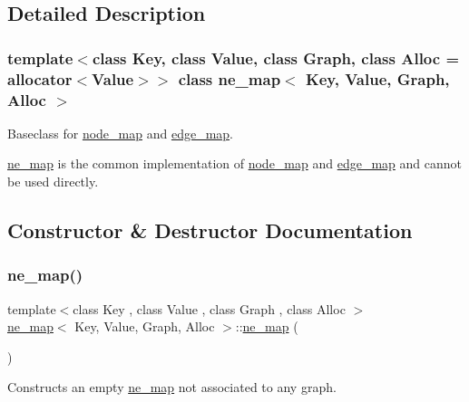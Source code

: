 \subsection{Detailed Description}
\subsubsection*{template$<$class Key, class Value, class Graph, class Alloc = allocator$<$\+Value$>$$>$\newline
class ne\+\_\+map$<$ Key, Value, Graph, Alloc $>$}

Baseclass for \mbox{\hyperlink{classnode__map}{node\+\_\+map}} and \mbox{\hyperlink{classedge__map}{edge\+\_\+map}}. 

\mbox{\hyperlink{classne__map}{ne\+\_\+map}} is the common implementation of {\ttfamily \mbox{\hyperlink{classnode__map}{node\+\_\+map}} } and {\ttfamily \mbox{\hyperlink{classedge__map}{edge\+\_\+map}} } and cannot be used directly. 

\subsection{Constructor \& Destructor Documentation}
\mbox{\label{classne__map_acbe94c2209408e8af27fb9580251f360}} 
\subsubsection{\texorpdfstring{ne\+\_\+map()}{ne\_map()}\hspace{0.1cm}{\footnotesize\ttfamily [1/2]}}
{\footnotesize\ttfamily template$<$class Key , class Value , class Graph , class Alloc $>$ \\
\mbox{\hyperlink{classne__map}{ne\+\_\+map}}$<$ Key, Value, Graph, Alloc $>$\+::\mbox{\hyperlink{classne__map}{ne\+\_\+map}} (\begin{DoxyParamCaption}{ }\end{DoxyParamCaption})\hspace{0.3cm}{\ttfamily [protected]}}

Constructs an empty {\ttfamily \mbox{\hyperlink{classne__map}{ne\+\_\+map}}} not associated to any {\ttfamily graph}. \mbox{\label{classne__map_a769ee373d4cd8d3ef2c1577372da149c}} 

